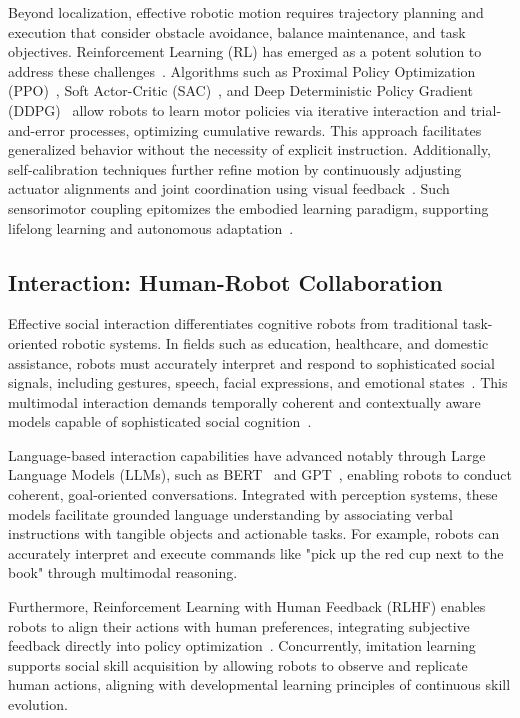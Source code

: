 \documentclass[conference]{IEEEtran}
\begin{document}
Beyond localization, effective robotic motion requires trajectory planning and execution that consider obstacle avoidance, balance maintenance, and task objectives. Reinforcement Learning (RL) has emerged as a potent solution to address these challenges~\cite{kormushev2013reinforcement}. Algorithms such as Proximal Policy Optimization (PPO)~\cite{schulman2017proximal}, Soft Actor-Critic (SAC)~\cite{haarnoja2018soft}, and Deep Deterministic Policy Gradient (DDPG)~\cite{qiu2019deep} allow robots to learn motor policies via iterative interaction and trial-and-error processes, optimizing cumulative rewards. This approach facilitates generalized behavior without the necessity of explicit instruction. Additionally, self-calibration techniques further refine motion by continuously adjusting actuator alignments and joint coordination using visual feedback~\cite{fang2022self}. Such sensorimotor coupling epitomizes the embodied learning paradigm, supporting lifelong learning and autonomous adaptation~\cite{bahadir2023investigating}.

\subsection{Interaction: Human-Robot Collaboration}
Effective social interaction differentiates cognitive robots from traditional task-oriented robotic systems. In fields such as education, healthcare, and domestic assistance, robots must accurately interpret and respond to sophisticated social signals, including gestures, speech, facial expressions, and emotional states~\cite{cangelosi2022cognitive}. This multimodal interaction demands temporally coherent and contextually aware models capable of sophisticated social cognition~\cite{wake2024gpt}.

Language-based interaction capabilities have advanced notably through Large Language Models (LLMs), such as BERT~\cite{devlin2019bert} and GPT~\cite{radford2018improving}, enabling robots to conduct coherent, goal-oriented conversations. Integrated with perception systems, these models facilitate grounded language understanding by associating verbal instructions with tangible objects and actionable tasks. For example, robots can accurately interpret and execute commands like "pick up the red cup next to the book" through multimodal reasoning.

Furthermore, Reinforcement Learning with Human Feedback (RLHF) enables robots to align their actions with human preferences, integrating subjective feedback directly into policy optimization~\cite{lin2020review}. Concurrently, imitation learning supports social skill acquisition by allowing robots to observe and replicate human actions, aligning with developmental learning principles of continuous skill evolution.
\end{document}
